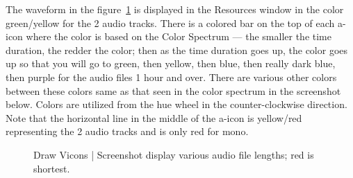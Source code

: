 The waveform in the figure~\ref{fig:vicons2} is displayed in the Resources window in the color green/yellow for the 2 audio tracks. 
There is a colored bar on the top of each a-icon where the color is based on the Color Spectrum --- the smaller the time duration, the redder the color; then as the time duration goes up, the color goes up so that you will go to green, then yellow, then blue, then really dark blue, then purple for the audio files 1 hour and over.  
There are various other colors between these colors same as that seen in the color spectrum in the screenshot below.  
Colors are utilized from the hue wheel in the counter-clockwise direction.  
Note that the horizontal line in the middle of the a-icon is yellow/red representing the 2 audio tracks and is only red for mono.



\begin{figure}[htpb]
    \centering
    \caption{Draw Vicons   |            Screenshot display various audio file lengths; red is shortest.}
    \label{fig:vicons2}
\end{figure}

